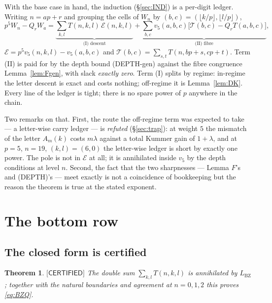 \documentclass[11pt,reqno]{amsart}
\theoremstyle{plain}
\newtheorem{theorem}{Theorem}[section]
\theoremstyle{definition}
\theoremstyle{remark}
\numberwithin{equation}{section}
\newcommand{\Tcal}{\mathcal{T}}
\newcommand{\Ecal}{\mathcal{E}}
\newcommand{\LBZ}{L_{\mathrm{BZ}}}
\newcommand{\vfive}{v_5}
\newcommand{\CERTIFIED}{\textsf{[CERTIFIED]}}
\begin{document}
With the base case in hand, the induction (\S\ref{sec:IND}) is a per-digit ledger. Writing
$n=ap+r$ and grouping the cells of $W_n$ by $(b,c)=(\lfloor k/p\rfloor,\lfloor l/p\rfloor)$,
\[
p^5W_n-Q_rW_a=\underbrace{\sum_{k,l}T(n,k,l)\,\Ecal(n,k,l)}_{\text{(I) descent}}
+\underbrace{\sum_{b,c}\vfive(a,b,c)\bigl[\Tcal(b,c)-Q_rT(a,b,c)\bigr]}_{\text{(II) fibre}} ,
\]
$\Ecal=p^5\vfive(n,k,l)-\vfive(a,b,c)$ and $\Tcal(b,c)=\sum_{s,t}T(n,bp+s,cp+t)$. Term (II) is
paid for by the depth bound (DEPTH-gen) against the fibre congruence Lemma~\ref{lem:Fgen},
with slack \emph{exactly zero}. Term (I) splits by regime: in-regime the letter descent is
exact and costs nothing; off-regime it is Lemma~\ref{lem:DK}. Every line of the ledger is
tight; there is no spare power of $p$ anywhere in the chain.

Two remarks on that. First, the route the off-regime term was expected to take --- a
letter-wise carry ledger --- is \emph{refuted} (\S\ref{sec:trap}): at weight $5$ the mismatch
of the letter $A_m(k)$ costs $m\lambda$ against a total Kummer gain of $1+\lambda$, and at
$p=5$, $n=19$, $(k,l)=(6,0)$ the letter-wise ledger is short by exactly one power. The pole is
not in $\Ecal$ at all; it is annihilated inside $\vfive$ by the depth conditions at level $n$.
Second, the fact that the two sharpnesses --- Lemma $F$'s and (DEPTH)'s --- meet exactly is not
a coincidence of bookkeeping but the reason the theorem is true at the stated exponent.

\section{The bottom row}\label{sec:Qrow}

\subsection{The closed form is certified}

\begin{theorem}\label{thm:Qcert}
$\CERTIFIED$ The double sum $\sum_{k,l}T(n,k,l)$ is annihilated by $\LBZ$; together with the
natural boundaries and agreement at $n=0,1,2$ this proves \eqref{eq:BZQ}.
\end{theorem}
\end{document}
